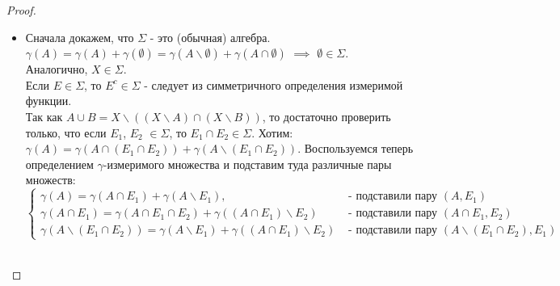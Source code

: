 \documentclass[a4paper]{article}
\theoremstyle{indented}
\theoremstyle{definition}
\theoremstyle{remark}
\begin{document}
\begin{proof}
\
\begin{itemize}

    \item Сначала докажем, что $\Sigma$ - это (обычная) алгебра.
    \\
    $\gamma(A)=\gamma(A)+\gamma(\emptyset) = \gamma(A \backslash \emptyset)+\gamma(A \cap \emptyset)$ $\implies$ $\emptyset \in \Sigma$. Аналогично, $X \in \Sigma$.
    \\
    Если $E \in \Sigma$, то $E^{c} \in \Sigma$ - следует из симметричного определения измеримой функции. 
    \\
    Так как $A \cup B = X \backslash ((X \backslash A) \cap (X \backslash B))$, то достаточно проверить только, что если $E_1$, $E_2$ $\in \Sigma$, то $E_1 \cap E_2 \in \Sigma$. Хотим: $\gamma(A)=\gamma(A \cap (E_1 \cap E_2))+\gamma(A \backslash (E_1 \cap E_2))$. Воспользуемся теперь определением $\gamma$-измеримого множества и подставим туда различные пары множеств:
    \\
    \begin{equation*}
\begin{cases}
  \gamma(A)=\gamma(A \cap E_1)+\gamma(A \backslash E_1),  & \mbox{ - подставили пару } (A, E_1) \\
  \gamma(A \cap E_1) = \gamma(A \cap E_1 \cap E_2)+ \gamma ((A \cap E_1) \backslash E_2)  & \mbox{ - подставили пару } (A \cap E_1, E_2) \\
  \gamma(A \backslash(E_1 \cap E_2)) = \gamma(A \backslash E_1)+\gamma((A \cap E_1) \backslash E_2) & \mbox{ - подставили пару } (A \backslash (E_1 \cap E_2), E_1)
\end{cases}
\end{equation*}
\


\end{itemize}
\end{proof}
\end{document}

